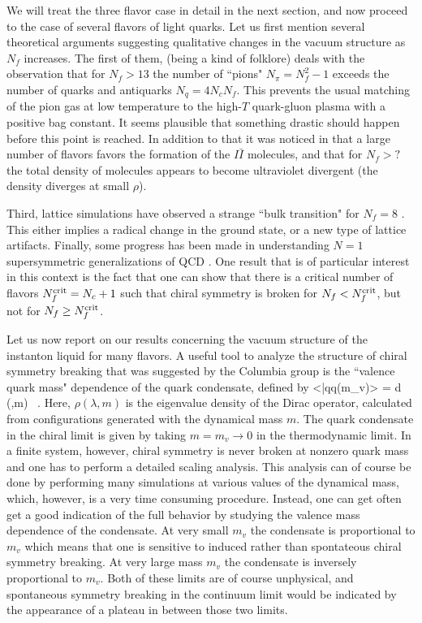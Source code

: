    We will treat the three flavor case in detail in the next section,
and now proceed to the case of several flavors of light quarks.
Let us first mention several theoretical arguments suggesting
qualitative changes in the vacuum structure as $N_f$ increases.
The first of them, (being a kind of folklore) deals with the
observation that for $N_f>13$ the number of ``pions" $N_{\pi}
=N_f^2-1$ exceeds the number of quarks and antiquarks  $N_{q}
=4 N_c N_f$. This prevents the usual matching of the pion gas
at low temperature to the high-$T$ quark-gluon plasma with a
positive bag constant. It seems plausible that something
drastic should happen before this point is reached. In addition
to that it was noticed in \cite{Shu_88} that a large number
of flavors favors the formation of the $I\bar I$ molecules, and
that for $N_f>?$ the total density of molecules appears to become
ultraviolet divergent (the density diverges at small $\rho$).

  Third, lattice simulations have observed a strange ``bulk transition"
for $N_f=8$ \cite{Chr_93}. This either implies a radical change in the
ground state, or a new type of lattice artifacts. Finally, some progress
has been made in understanding $N=1$ supersymmetric generalizations of
QCD \cite{Sei_94}. One result that is of particular interest in this
context is the fact that one can show that there is a critical number
of flavors $N_f^{\rm crit}=N_c+1$ such that chiral symmetry is broken
for $N_f<N_f^{\rm crit}$, but not for $N_f\geq N_f^{\rm crit}$.

   Let us now report on our results concerning the vacuum structure of
the instanton liquid for many flavors. A useful tool to analyze the
structure of chiral symmetry breaking that was suggested by the
Columbia group \cite{Cha_95} is the ``valence quark mass"
dependence of the quark condensate, defined by
\be
\label{qq_val}
<\bar qq(m_v)> = \int d\lambda\,\rho(\lambda,m)
  \, .
\ee
Here, $\rho(\lambda,m)$ is the eigenvalue density of the Dirac operator,
calculated from configurations generated with the dynamical mass $m$.
The quark condensate in the chiral limit is given by taking $m=m_v\to 0$
in the thermodynamic limit. In a finite system, however, chiral symmetry
is never broken at nonzero quark mass and one has to perform a detailed
scaling analysis. This analysis can of course be done by performing many
simulations at various values of the dynamical mass, which, however, is
a very time consuming procedure. Instead, one can get often get a
good indication of the full behavior by studying the valence mass
dependence of the condensate. At very small $m_v$ the condensate
is proportional to $m_v$ which means that one is sensitive to
induced rather than spontateous chiral symmetry breaking. At very
large mass $m_v$ the condensate is inversely proportional to $m_v$.
Both of these limits are of course unphysical, and spontaneous
symmetry breaking in the continuum limit would be indicated by the
appearance of a plateau in between those two limits.

